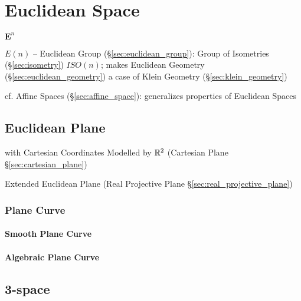 \section{Euclidean Space}\label{sec:euclidean_space}

$\mathbf{E}^n$


$E(n)$ -- Euclidean Group (\S\ref{sec:euclidean_group}): Group of
Isometries (\S\ref{sec:isometry}) $ISO(n)$; makes Euclidean Geometry
(\S\ref{sec:euclidean_geometry}) a case of Klein Geometry
(\S\ref{sec:klein_geometry})

cf. Affine Spaces (\S\ref{sec:affine_space}): generalizes properties
of Euclidean Spaces



\subsection{Euclidean Plane}\label{sec:euclidean_plane}

with Cartesian Coordinates Modelled by $\mathbb{R}^2$ (Cartesian Plane
\S\ref{sec:cartesian_plane})

\fist Extended Euclidean Plane (Real Projective Plane
\S\ref{sec:real_projective_plane})



\subsubsection{Plane Curve}\label{sec:plane_curve}

\paragraph{Smooth Plane Curve}\label{sec:smooth_plane_curve}\hfill

\paragraph{Algebraic Plane Curve}\label{sec:algebraic_plane_curve}\hfill



\subsection{3-space}\label{sec:3_space}

